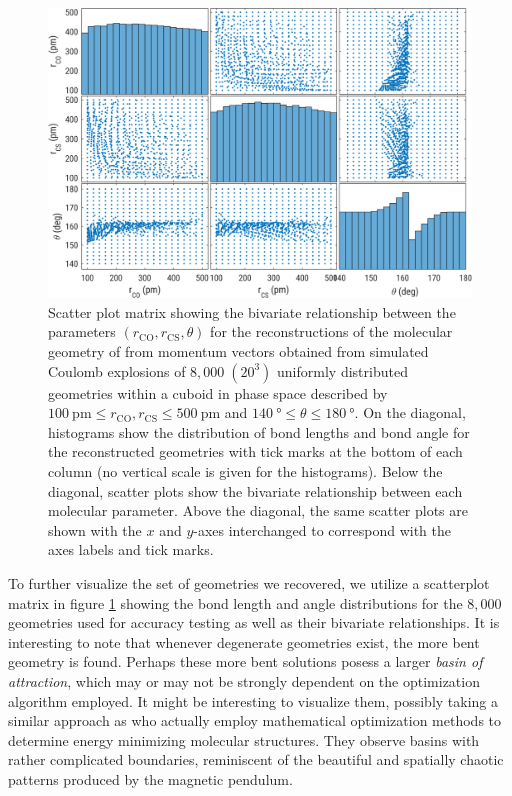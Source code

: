 \begin{figure}
  \centering
  \includegraphics[width=\textwidth]{Plots/OCS222DegeneracyMapHDPairs}
  \caption[Scatter plot matrix showing the bivariate relationship between the parameters $(r_\mathrm{CO}, r_\mathrm{CS}, \theta)$ for the reconstructions of the molecular geometry of  from momentum vectors obtained from simulated Coulomb explosions.]
  {Scatter plot matrix showing the bivariate relationship between the parameters $(r_\mathrm{CO}, r_\mathrm{CS}, \theta)$ for the reconstructions of the molecular geometry of  from momentum vectors obtained from simulated Coulomb explosions of $8,000 \; (20^3)$ uniformly distributed geometries within a cuboid in phase space described by $\SI{100}{\pico\meter} \le r_\mathrm{CO}, r_\mathrm{CS} \le \SI{500}{\pico\meter}$ and $\SI{140}{\degree} \le \theta \le \SI{180}{\degree}$. On the diagonal, histograms show the distribution of bond lengths and bond angle for the reconstructed geometries with tick marks at the bottom of each column (no vertical scale is given for the histograms). Below the diagonal, scatter plots show the bivariate relationship between each molecular parameter. Above the diagonal, the same scatter plots are shown with the $x$ and $y$-axes interchanged to correspond with the axes labels and tick marks.}
  \label{fig:OCS222DegeneracyMapHDPairs}
\end{figure}

To further visualize the set of geometries we recovered, we utilize a scatterplot matrix in figure \ref{fig:OCS222DegeneracyMapHDPairs} showing the bond length and angle distributions for the $8,000$ geometries used for accuracy testing as well as their bivariate relationships. It is interesting to note that whenever degenerate geometries exist, the more bent geometry is found. Perhaps these more bent solutions posess a larger \emph{basin of attraction}, which may or may not be strongly dependent on the optimization algorithm employed. It might be interesting to visualize them, possibly taking a similar approach as \citet{Asenjo13} who actually employ mathematical optimization methods to determine energy minimizing molecular structures. They observe basins with rather complicated boundaries, reminiscent of the beautiful and spatially chaotic patterns produced by the magnetic pendulum.

